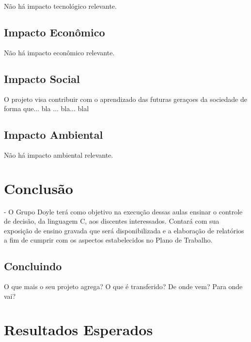 \documentclass[a4paper,10pt]{article}  %
\begin{document}
  Não há impacto tecnológico relevante.

 \subsection{Impacto Econômico}

  Não há impacto econômico relevante.

 \subsection{Impacto Social}

   O projeto visa contribuir com o aprendizado das futuras geraçoes da sociedade de forma que... bla ... bla... blal


 \subsection{Impacto Ambiental}

 Não há impacto ambiental relevante.


\section{Conclusão}

   -  O Grupo Doyle terá como objetivo na execução dessas aulas ensinar o controle de decisão, da linguagem C, aos discentes interessados.
 Contará com sua exposição de ensino gravada que será disponibilizada e a elaboração de relatórios a fim de cumprir com os aspectos estabelecidos no Plano de Trabalho.

 \subsection{Concluindo}


  O que mais o seu projeto agrega? O que é transferido? De onde vem? Para onde vai?


\section{Resultados Esperados}
\end{document}
